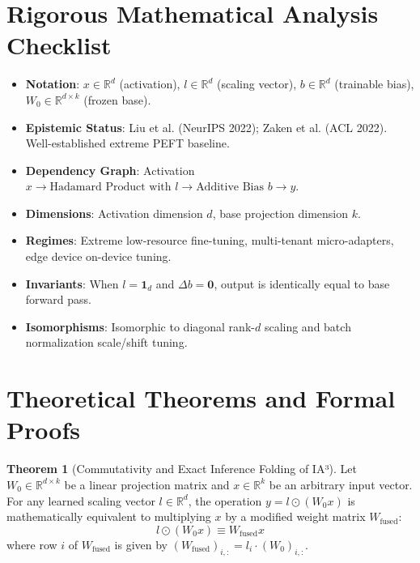 \documentclass[11pt,a4paper]{article}
\theoremstyle{definition}
\newtheorem{theorem}{\textbf{Theorem}}[section]
\begin{document}
\section{Rigorous Mathematical Analysis Checklist}

\begin{itemize}
    \item \textbf{Notation}: $x \in \mathbb{R}^d$ (activation), $l \in \mathbb{R}^d$ (scaling vector), $b \in \mathbb{R}^d$ (trainable bias), $W_0 \in \mathbb{R}^{d \times k}$ (frozen base).
    \item \textbf{Epistemic Status}: Liu et al. (NeurIPS 2022); Zaken et al. (ACL 2022). Well-established extreme PEFT baseline.
    \item \textbf{Dependency Graph}: Activation $x \to \text{Hadamard Product with } l \to \text{Additive Bias } b \to y$.
    \item \textbf{Dimensions}: Activation dimension $d$, base projection dimension $k$.
    \item \textbf{Regimes}: Extreme low-resource fine-tuning, multi-tenant micro-adapters, edge device on-device tuning.
    \item \textbf{Invariants}: When $l = \mathbf{1}_d$ and $\Delta b = \mathbf{0}$, output is identically equal to base forward pass.
    \item \textbf{Isomorphisms}: Isomorphic to diagonal rank-$d$ scaling and batch normalization scale/shift tuning.
\end{itemize}

\section{Theoretical Theorems and Formal Proofs}

\begin{theorem}[Commutativity and Exact Inference Folding of IA³]
Let $W_0 \in \mathbb{R}^{d \times k}$ be a linear projection matrix and $x \in \mathbb{R}^k$ be an arbitrary input vector. For any learned scaling vector $l \in \mathbb{R}^d$, the operation $y = l \odot (W_0 x)$ is mathematically equivalent to multiplying $x$ by a modified weight matrix $W_{\text{fused}}$:
{\boldmath
\begin{equation}
l \odot (W_0 x) \equiv W_{\text{fused}} x
\end{equation}
}
where row $i$ of $W_{\text{fused}}$ is given by $(W_{\text{fused}})_{i,:} = l_i \cdot (W_0)_{i,:}$.
\end{theorem}
\end{document}
